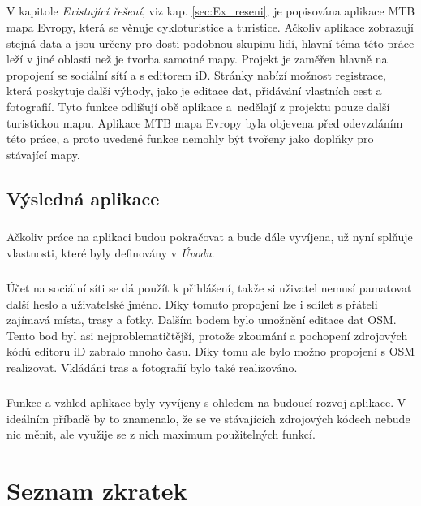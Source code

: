 \documentclass[11pt,a4paper,titlepage,oneside]{book}
\begin{document}
			\paragraph{} V kapitole \textit{Existující řešení}, viz kap. \ref{sec:Ex_reseni}, je popisována aplikace MTB mapa Evropy, která se věnuje cykloturistice a turistice. Ačkoliv aplikace zobrazují stejná data a jsou určeny pro dosti podobnou skupinu lidí, hlavní téma této práce leží v jiné oblasti než je tvorba samotné mapy. Projekt  je zaměřen hlavně na propojení se sociální sítí a s editorem iD. Stránky  nabízí možnost registrace, která poskytuje další výhody, jako je editace dat, přidávání vlastních cest a fotografií. Tyto funkce odlišují obě aplikace a~nedělají z projektu  pouze další turistickou mapu. Aplikace MTB mapa Evropy byla objevena před odevzdáním této práce, a proto uvedené funkce nemohly být tvořeny jako doplňky pro stávající mapy.

		\section{Výsledná aplikace}
			\paragraph{} Ačkoliv práce na aplikaci budou pokračovat a bude dále vyvíjena, už nyní splňuje vlastnosti, které byly definovány v \textit{Úvodu}. 
			\paragraph {}Účet na sociální síti se dá použít k přihlášení, takže si uživatel nemusí pamatovat další heslo a uživatelské jméno. Díky tomuto propojení lze i sdílet s přáteli zajímavá místa, trasy a fotky. Dalším bodem bylo umožnění editace dat \ac{OSM}. Tento bod byl asi nejproblematičtější, protože zkoumání a pochopení zdrojových kódů editoru iD zabralo mnoho času. Díky tomu ale bylo možno propojení s \acl{OSM} realizovat. Vkládání tras a fotografií bylo také realizováno.
			\paragraph{} Funkce a vzhled aplikace byly vyvíjeny s ohledem na budoucí rozvoj aplikace. V ideálním příbadě by to znamenalo, že se ve stávajících zdrojových kódech nebude nic měnit, ale využije se z nich maximum použitelných funkcí.


\newpage 
\chapter*{Seznam zkratek}
\end{document}
